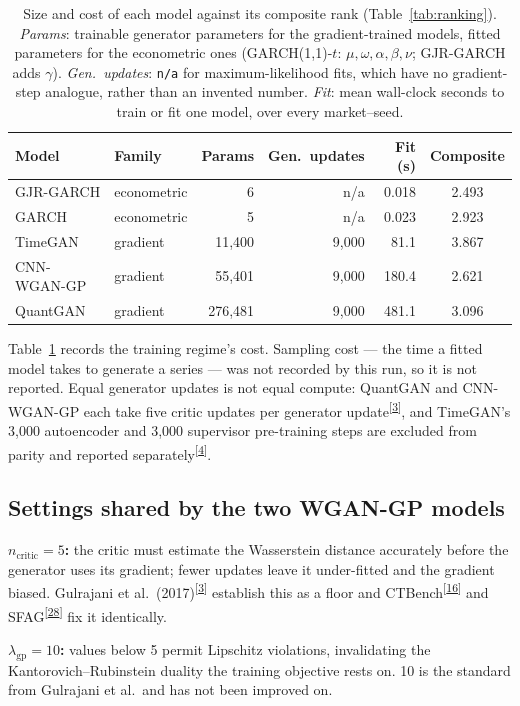 \documentclass[11pt,a4paper]{article}
\makeatletter
\newcommand{\tcite}[1]{\textsuperscript{[\hyperlink{R:#1}{#1}]}}
\DeclareRobustCommand{\_}{\ifmmode\nfss@text{\textunderscore}\else\textunderscore\allowbreak\fi}
\makeatother
\begin{document}
\begin{table}[htbp]
\centering
\caption{Size and cost of each model against its composite rank (Table~\ref{tab:ranking}). \emph{Params}: trainable generator parameters for the gradient-trained models, fitted parameters for the econometric ones (GARCH(1,1)-$t$: $\mu,\omega,\alpha,\beta,\nu$; GJR-GARCH adds $\gamma$). \emph{Gen.\ updates}: \texttt{n/a} for maximum-likelihood fits, which have no gradient-step analogue, rather than an invented number. \emph{Fit}: mean wall-clock seconds to train or fit one model, over every market--seed.}
\label{tab:compute}
\begin{tabular}{@{}llrrrc@{}}
\toprule
Model & Family & Params & Gen.\ updates & Fit (s) & Composite \\
\midrule
GJR-GARCH & econometric & 6 & n/a & 0.018 & 2.493 \\
GARCH & econometric & 5 & n/a & 0.023 & 2.923 \\
TimeGAN & gradient & 11,400 & 9,000 & 81.1 & 3.867 \\
CNN-WGAN-GP & gradient & 55,401 & 9,000 & 180.4 & 2.621 \\
QuantGAN & gradient & 276,481 & 9,000 & 481.1 & 3.096 \\
\bottomrule
\end{tabular}
\end{table}

Table~\ref{tab:compute} records the training regime's cost. Sampling cost --- the time a fitted model takes to generate a series --- was not recorded by this run, so it is not reported. Equal generator updates is not equal compute: QuantGAN and CNN-WGAN-GP each take five critic updates per generator update\tcite{3}, and TimeGAN's 3,000 autoencoder and 3,000 supervisor pre-training steps are excluded from parity and reported separately\tcite{4}.

\subsection{Settings shared by the two WGAN-GP models}
\textbf{$n_\text{critic}=5$:} the critic must estimate the Wasserstein distance accurately before the generator uses its gradient; fewer updates leave it under-fitted and the gradient biased. Gulrajani et al.\ (2017)\tcite{3} establish this as a floor and CTBench\tcite{16} and SFAG\tcite{28} fix it identically.

\textbf{$\lambda_\text{gp}=10$:} values below 5 permit Lipschitz violations, invalidating the Kantorovich--Rubinstein duality the training objective rests on. 10 is the standard from Gulrajani et al.\ and has not been improved on.
\end{document}
